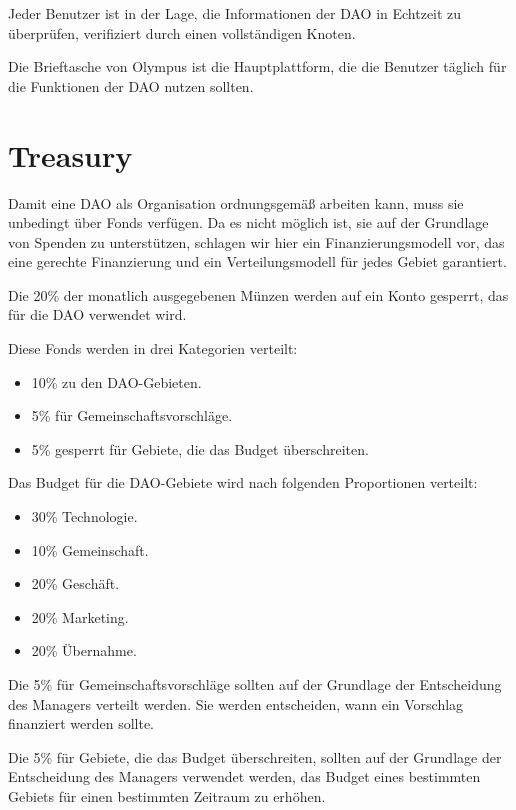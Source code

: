 \documentclass{article}
\begin{document}
Jeder Benutzer ist in der Lage, die Informationen der DAO in Echtzeit zu überprüfen, verifiziert durch einen vollständigen Knoten. 

Die Brieftasche von Olympus ist die Hauptplattform, die die Benutzer täglich für die Funktionen der DAO nutzen sollten.

\section{Treasury}

Damit eine DAO als Organisation ordnungsgemäß arbeiten kann, muss sie unbedingt über Fonds verfügen. Da es nicht möglich ist, sie auf der Grundlage von Spenden zu unterstützen, schlagen wir hier ein Finanzierungsmodell vor, das eine gerechte Finanzierung und ein Verteilungsmodell für jedes Gebiet garantiert.

Die 20\% der monatlich ausgegebenen Münzen werden auf ein Konto gesperrt, das für die DAO verwendet wird.

Diese Fonds werden in drei Kategorien verteilt:

\begin{itemize}
  \item 10\% zu den DAO-Gebieten.
  \item 5\% für Gemeinschaftsvorschläge.
  \item 5\% gesperrt für Gebiete, die das Budget überschreiten.
\end{itemize}

Das Budget für die DAO-Gebiete wird nach folgenden Proportionen verteilt:

\begin{itemize}
  \item 30\% Technologie.
  \item 10\% Gemeinschaft.
  \item 20\% Geschäft.
  \item 20\% Marketing.
  \item 20\% Übernahme.
\end{itemize}

Die 5\% für Gemeinschaftsvorschläge sollten auf der Grundlage der Entscheidung des Managers verteilt werden. Sie werden entscheiden, wann ein Vorschlag finanziert werden sollte.

Die 5\% für Gebiete, die das Budget überschreiten, sollten auf der Grundlage der Entscheidung des Managers verwendet werden, das Budget eines bestimmten Gebiets für einen bestimmten Zeitraum zu erhöhen.
\end{document}
